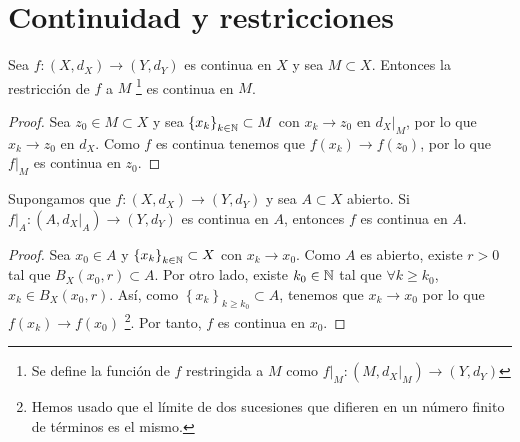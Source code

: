 \section{Continuidad y restricciones}
\begin{prop}
Sea $\displaystyle f : \left(X,d _{X}\right) \to \left(Y, d _{Y}\right) $ es continua en $\displaystyle X $ y sea $\displaystyle M \subset X $. Entonces la restricción de $\displaystyle f $ a $\displaystyle M $ \footnote{Se define la función de $\displaystyle f $ restringida a $\displaystyle M $ como $\displaystyle f|_{M}:\left(M, d _{X}|_{M}\right) \to \left(Y, d _{Y}\right) $} es continua en $\displaystyle M $. 
\end{prop}
\begin{proof}
	Sea $\displaystyle z_{0} \in M \subset X $ y sea $\displaystyle \left\{ x_{k}\right\} _{k \in \mathbb{N}} \subset M $ con $\displaystyle x_{k} \to z_{0} $ en $\displaystyle d _{X} |_{M} $, por lo que $\displaystyle x_{k} \to z_{0} $ en $\displaystyle d _{X} $. Como $\displaystyle f $ es continua tenemos que $\displaystyle f\left(x_{k}\right) \to f\left(z_{0}\right) $, por lo que $\displaystyle f|_{M} $ es continua en $\displaystyle z_{0} $.
\end{proof}
\begin{prop}
Supongamos que $\displaystyle f : \left(X, d _{X}\right) \to \left(Y, d _{Y}\right) $ y sea $\displaystyle A \subset X $ abierto. Si $\displaystyle f|_{A} : \left(A, d _{X}|_{A}\right) \to \left(Y, d _{Y}\right) $ es continua en $\displaystyle A $, entonces $\displaystyle f $ es continua en $\displaystyle A $.
\end{prop}
\begin{proof}
	Sea $\displaystyle x_{0} \in A $ y $\displaystyle \left\{ x_{k}\right\} _{k \in \mathbb{N}} \subset X $ con $\displaystyle x_{k} \to x_{0} $. Como $\displaystyle A $ es abierto, existe $\displaystyle r > 0 $ tal que $\displaystyle B_{X}\left(x_{0},r\right) \subset A $. Por otro lado, existe $\displaystyle k_{0} \in \mathbb{N} $ tal que $\displaystyle \forall k \geq k_{0} $, $\displaystyle x_{k} \in B_{X}\left(x_{0}, r\right) $.
	Así, como $\displaystyle \left\{ x_{k}\right\}_{k \geq k_{0}} \subset A $, tenemos que $\displaystyle x_{k} \to x_{0} $ por lo que $\displaystyle f\left(x_{k}\right) \to f\left(x_{0}\right) $ \footnote{Hemos usado que el límite de dos sucesiones que difieren en un número finito de términos es el mismo.}. Por tanto, $\displaystyle f $ es continua en $\displaystyle x_{0} $.
\end{proof}
